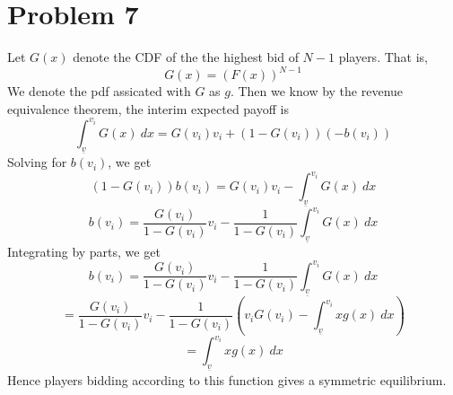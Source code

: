 \documentclass[10pt,letter]{article}
\begin{document}
\section*{Problem 7}
Let $G(x)$ denote the CDF of the the highest bid of $N-1$ players. That is,
\[ G(x) = (F(x))^{N-1} \]
We denote the pdf assicated with $G$ as $g$. Then we know by the revenue equivalence theorem, the interim expected payoff is
\[ \int_{\underline{v}}^{v_i} G(x) \ dx = G(v_i) v_i + (1-G(v_i))(- b(v_i))  \]
Solving for $b(v_i)$, we get
\[ (1-G(v_i)) b(v_i) = G(v_i) v_i - \int_{\underline{v}}^{v_i} G(x) \ dx    \]
\[  b(v_i) = \frac{G(v_i)}{1-G(v_i)} v_i -\frac{1}{1-G(v_i)} \int_{\underline{v}}^{v_i} G(x) \ dx    \]
Integrating by parts, we get
\[  b(v_i) = \frac{G(v_i)}{1-G(v_i)} v_i -\frac{1}{1-G(v_i)} \int_{\underline{v}}^{v_i} G(x) \ dx    \]
\[ = \frac{G(v_i)}{1-G(v_i)} v_i - \frac{1}{1-G(v_i)}  \left( v_i G(v_i) - \int_{\underline{v}}^{v_i} x g(x) \ dx  \right)  \]
\[ =  \int_{\underline{v}}^{v_i} x g(x) \ dx   \]
Hence players bidding according to this function gives a symmetric equilibrium.
\end{document}
